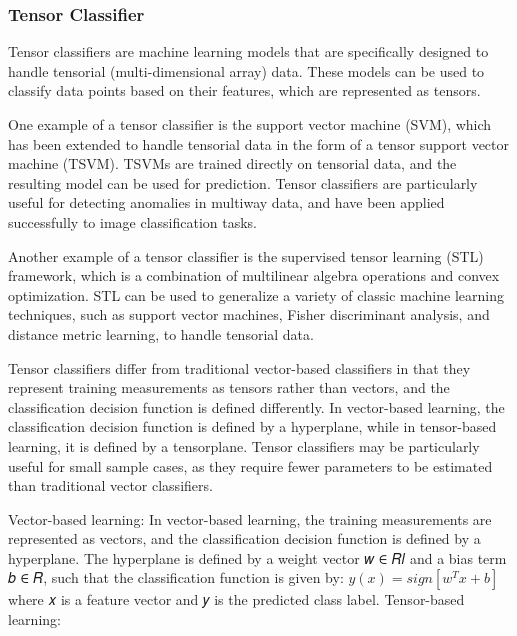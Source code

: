 \documentclass{article}
\theoremstyle{mytheoremstyle}
\theoremstyle{mytheoremstyle}
\theoremstyle{myproblemstyle}
\begin{document}
\subsubsection{Tensor Classifier}

\begin{definition}
	Tensor classifiers are machine learning models that are specifically designed to handle tensorial (multi-dimensional array) data. These models can be used to classify data points based on their features, which are represented as tensors.
\end{definition}

One example of a tensor classifier is the support vector machine (SVM), which has been extended to handle tensorial data in the form of a tensor support vector machine (TSVM). TSVMs are trained directly on tensorial data, and the resulting model can be used for prediction. Tensor classifiers are particularly useful for detecting anomalies in multiway data, and have been applied successfully to image classification tasks.

Another example of a tensor classifier is the supervised tensor learning (STL) framework, which is a combination of multilinear algebra operations and convex optimization. STL can be used to generalize a variety of classic machine learning techniques, such as support vector machines, Fisher discriminant analysis, and distance metric learning, to handle tensorial data.

Tensor classifiers differ from traditional vector-based classifiers in that they represent training measurements as tensors rather than vectors, and the classification decision function is defined differently. In vector-based learning, the classification decision function is defined by a hyperplane, while in tensor-based learning, it is defined by a tensorplane. Tensor classifiers may be particularly useful for small sample cases, as they require fewer parameters to be estimated than traditional vector classifiers.

Vector-based learning:
In vector-based learning, the training measurements are represented as vectors, and the classification decision function is defined by a hyperplane. The hyperplane is defined by a weight vector 𝑤 ∈ 𝑅𝑙 and a bias term 𝑏 ∈ 𝑅, such that the classification function is given by:
\begin{math}
	y(𝑥) = sign[𝑤^𝑇𝑥 + 𝑏]
\end{math}
where 𝑥 is a feature vector and 𝑦 is the predicted class label.
Tensor-based learning:
\end{document}
